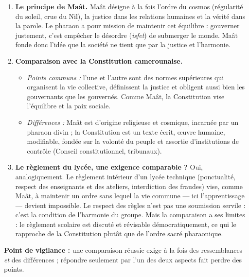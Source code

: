 \documentclass[11pt]{article}
\newcommand{\cle}[1]{{\popxbold\color{popdark}#1}}
\begin{document}
\begin{corrige}
\begin{enumerate}
\item \textbf{Le principe de Maât.} \cle{Maât} désigne à la fois l'ordre du cosmos (régularité du soleil, crue du Nil), la justice dans les relations humaines et la vérité dans la parole. Le pharaon a pour mission de maintenir cet équilibre : gouverner justement, c'est empêcher le désordre (\emph{isfet}) de submerger le monde. Maât fonde donc l'idée que la société ne tient que par la justice et l'harmonie.
\item \textbf{Comparaison avec la Constitution camerounaise.}
\begin{itemize}
\item \emph{Points communs :} l'une et l'autre sont des normes supérieures qui organisent la vie collective, définissent la justice et obligent aussi bien les gouvernants que les gouvernés. Comme Maât, la Constitution vise l'équilibre et la paix sociale.
\item \emph{Différences :} Maât est d'origine religieuse et cosmique, incarnée par un pharaon divin ; la Constitution est un texte écrit, œuvre humaine, modifiable, fondée sur la volonté du peuple et assortie d'institutions de contrôle (Conseil constitutionnel, tribunaux).
\end{itemize}
\item \textbf{Le règlement du lycée, une exigence comparable ?} Oui, analogiquement. Le règlement intérieur d'un lycée technique (ponctualité, respect des enseignants et des ateliers, interdiction des fraudes) vise, comme Maât, à maintenir un ordre sans lequel la vie commune — ici l'apprentissage — devient impossible. Le respect des règles n'est pas une soumission servile : c'est la condition de l'harmonie du groupe. Mais la comparaison a ses limites : le règlement scolaire est discuté et révisable démocratiquement, ce qui le rapproche de la Constitution plutôt que de l'ordre sacré pharaonique.
\end{enumerate}
\textbf{Point de vigilance :} une comparaison réussie exige à la fois des ressemblances \emph{et} des différences ; répondre seulement par l'un des deux aspects fait perdre des points.
\end{corrige}
\end{document}
